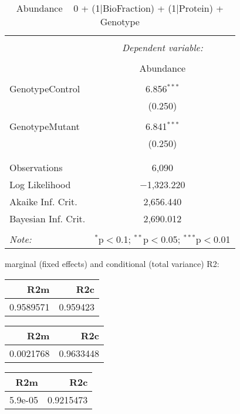 \documentclass[11pt]{report}
\begin{document}
\begin{table}[!htbp] \centering 
  \caption{Abundance ~ 0 + (1|BioFraction) + (1|Protein) + Genotype} 
  \label{} 
\begin{tabular}{@{\extracolsep{5pt}}lc} 
\\[-1.8ex]\hline 
\hline \\[-1.8ex] 
 & \multicolumn{1}{c}{\textit{Dependent variable:}} \\ 
\cline{2-2} 
\\[-1.8ex] & Abundance \\ 
\hline \\[-1.8ex] 
 GenotypeControl & 6.856$^{***}$ \\ 
  & (0.250) \\ 
  & \\ 
 GenotypeMutant & 6.841$^{***}$ \\ 
  & (0.250) \\ 
  & \\ 
\hline \\[-1.8ex] 
Observations & 6,090 \\ 
Log Likelihood & $-$1,323.220 \\ 
Akaike Inf. Crit. & 2,656.440 \\ 
Bayesian Inf. Crit. & 2,690.012 \\ 
\hline 
\hline \\[-1.8ex] 
\textit{Note:}  & \multicolumn{1}{r}{$^{*}$p$<$0.1; $^{**}$p$<$0.05; $^{***}$p$<$0.01} \\ 
\end{tabular} 
\end{table} 
marginal (fixed effects) and conditional (total variance) R2:

\begin{tabular}{r|r}
\hline
R2m & R2c\\
\hline
0.9589571 & 0.959423\\
\hline
\end{tabular}

\begin{tabular}{r|r}
\hline
R2m & R2c\\
\hline
0.0021768 & 0.9633448\\
\hline
\end{tabular}

\begin{tabular}{r|r}
\hline
R2m & R2c\\
\hline
5.9e-05 & 0.9215473\\
\hline
\end{tabular}
\end{document}
